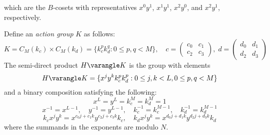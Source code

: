which are the $B$-cosets with representatives $x^0y^1$,
$x^1y^1$, $x^2y^0$, and $x^2y^1$, respectively.

Define an \emph{action group} $K$ as follows:
\[
K = C_M(k_c)\times C_M(k_d) = \{k_c^p k_d^q : 0 \leq p,q < M\}, \quad
c = \begin{pmatrix} c_0 & c_1 \\ c_2 & c_3 \end{pmatrix}, \;
d = \begin{pmatrix} d_0 & d_1 \\ d_2 & d_3 \end{pmatrix}
\]
The semi-direct product $H\varangle K$ is the group with elements
\[
H\varangle K = \{x^j y^k k_c^p k_d^p : 0 \leq j,k < L, 0 \leq p, q < M\}
\]
and a binary composition satisfying the following:
\[
x^L = y^L = k_c^M = k_d^M = 1
\]
\[
x^{-1} = x^{L-1}, \quad y^{-1}= y^{L-1}, \quad k_c^{-1} = k_c^{M-1}, \quad k_d^{-1} = k_d^{M-1}
\]
\[
k_c x^j y^k = x^{c_0 j + c_1 k} y^{c_2 j + c_3 k} k_c, \quad
k_d x^j y^k = x^{d_0 j + d_1 k} y^{d_2 j + d_3 k} k_d
\]
where the summands in the exponents are modulo $N$.

